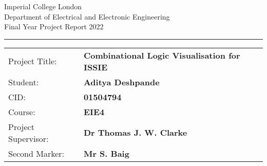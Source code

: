 \begin{titlepage}
                \setlength{\parindent}{0pt}
                \setlength{\parskip}{0pt}

                {
                                \Large
                                \raggedright
                                Imperial College London\\[17pt]
                                Department of Electrical and Electronic Engineering\\[17pt]
                                Final Year Project Report 2022\\[17pt]
 
                }

                \rule{\columnwidth}{3pt}
                \vfill
                \centering

                \setlength{\tabcolsep}{0pt}

                \begin{tabular}{p{40mm}p{\dimexpr\columnwidth-40mm}}
                                Project Title: & \textbf{Combinational Logic Visualisation for ISSIE} \\[12pt]
                                Student: & \textbf{Aditya Deshpande} \\[12pt]
                                CID: & \textbf{01504794} \\[12pt]
                                Course: & \textbf{EIE4} \\[12pt]
                                Project Supervisor: & \textbf{Dr Thomas J. W. Clarke} \\[12pt]
                                Second Marker: & \textbf{Mr S. Baig} \\
                \end{tabular}
\end{titlepage}